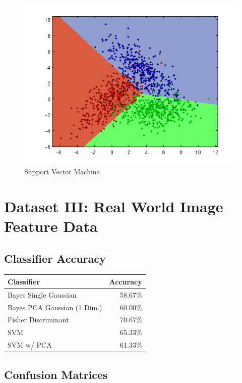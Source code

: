 \documentclass[a4paper]{article}
\begin{document}
\begin{figure}[htbp!]
\center
\includegraphics[clip, trim=40px 15px 30px 10px]{svm_d.png}
\caption{Support Vector Machine}
\end{figure}

\section{Dataset III: Real World Image Feature Data}

\subsection{Classifier Accuracy}

\begin{tabular}{ | l | r | }
\hline
\textbf{Classifier} & \textbf{Accuracy} \\
\hline
Bayes Single Gaussian  &   58.67\% \\
\hline
Bayes PCA Gaussian (1 Dim.)  &   60.00\% \\
\hline
Fisher Discriminant  &   70.67\% \\
\hline
SVM          &   65.33\% \\
\hline
SVM w/ PCA & 61.33\% \\
\hline
\end{tabular}


\subsection{Confusion Matrices}
\end{document}

